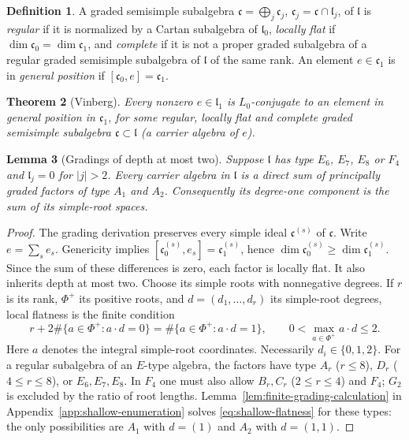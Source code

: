 \documentclass{article}
\newtheorem{theorem}{Theorem}[section]
\newtheorem{lemma}[theorem]{Lemma}
\theoremstyle{definition}
\newtheorem{definition}[theorem]{Definition}
\theoremstyle{remark}
\begin{document}
\begin{definition}
\label{def:carrier}
A graded semisimple subalgebra
$\mathfrak c=\bigoplus_j\mathfrak c_j$, $\mathfrak c_j=\mathfrak c\cap\mathfrak l_j$, of
$\mathfrak l$ is
\emph{regular} if it is normalized by a Cartan subalgebra of $\mathfrak l_0$,
\emph{locally flat} if $\dim\mathfrak c_0=\dim\mathfrak c_1$, and
\emph{complete} if it is not a proper graded subalgebra of a regular graded
semisimple subalgebra of $\mathfrak l$ of the same rank. An element
$e\in\mathfrak c_1$ is in \emph{general position} if
$[\mathfrak c_0,e]=\mathfrak c_1$.
\end{definition}

\begin{theorem}[Vinberg]
\label{thm:vinberg-carrier}
Every nonzero $e\in\mathfrak l_1$ is $L_0$-conjugate to an element in general
position in $\mathfrak c_1$, for some regular, locally flat and complete
graded semisimple subalgebra $\mathfrak c\subset\mathfrak l$ (a \emph{carrier
algebra} of $e$).
\end{theorem}
\begin{lemma}[Gradings of depth at most two]
\label{lem:shallow-carriers}
Suppose $\mathfrak l$ has type $E_6$, $E_7$, $E_8$ or $F_4$ and
$\mathfrak l_j=0$ for $|j|>2$. Every carrier algebra in
$\mathfrak l$ is a direct sum of principally graded factors of type
$A_1$ and $A_2$. Consequently its degree-one component is the sum of its
simple-root spaces.
\end{lemma}

\begin{proof}
The grading derivation preserves every simple ideal
$\mathfrak c^{(s)}$ of $\mathfrak c$. Write $e=\sum_s e_s$.
Genericity implies
$[\mathfrak c^{(s)}_0,e_s]=\mathfrak c^{(s)}_1$, hence
$\dim\mathfrak c^{(s)}_0\ge\dim\mathfrak c^{(s)}_1$.
Since the sum of these differences is zero, each factor is locally flat.
It also inherits depth at most two. Choose its simple roots with
nonnegative degrees. If $r$ is its rank,
$\Phi^+$ its positive roots, and $d=(d_1,\ldots,d_r)$ its simple-root
degrees, local flatness is the finite condition
\begin{equation}
 r+2\#\{a\in\Phi^+:a\cdot d=0\}
   =\#\{a\in\Phi^+:a\cdot d=1\},
 \qquad 0<\max_{a\in\Phi^+}a\cdot d\le2.
 \label{eq:shallow-flatness}
\end{equation}
Here $a$ denotes the integral simple-root coordinates. Necessarily
$d_i\in\{0,1,2\}$. For a regular subalgebra of an $E$-type algebra,
the factors have type $A_r$ ($r\le8$), $D_r$ ($4\le r\le8$),
or $E_6,E_7,E_8$. In $F_4$ one must also allow $B_r,C_r$
($2\le r\le4$) and $F_4$; $G_2$ is excluded by the ratio of root
lengths. Lemma~\ref{lem:finite-grading-calculation} in
Appendix~\ref{app:shallow-enumeration} solves
\eqref{eq:shallow-flatness} for these types: the only possibilities
are $A_1$ with $d=(1)$ and $A_2$ with $d=(1,1)$.
\end{proof}
\end{document}
